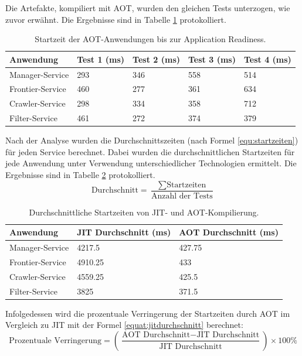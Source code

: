 Die Artefakte, kompiliert mit \ac{AOT}, wurden den gleichen Tests unterzogen, wie zuvor erwähnt. Die Ergebnisse sind in Tabelle \ref{tab:startzeitaot} protokolliert.
\begin{table}[H]
\centering
\begin{tabular}{|l|l|l|l|l|}
\hline
\textbf{Anwendung}     & \textbf{Test 1 (ms)} & \textbf{Test 2 (ms)} & \textbf{Test 3 (ms)} & \textbf{Test 4 (ms)} \\ \hline
\multirow{1}{*}{Manager-Service}  & 293 & 346 & 558 & 514 \\ \hline
\multirow{1}{*}{Frontier-Service}        & 460 & 277 & 361 & 634 \\ \hline
\multirow{1}{*}{Crawler-Service}         & 298 & 334 & 358 & 712 \\ \hline
\multirow{1}{*}{Filter-Service}          & 461 & 272 & 374 & 379 \\ \hline
\end{tabular}
\caption{Startzeit der AOT-Anwendungen bis zur Application Readiness.}
\label{tab:startzeitaot}
\end{table}
Nach der Analyse wurden die Durchschnittszeiten (nach Formel \ref{equ:startzeiten}) für jeden Service berechnet. Dabei wurden die durchschnittlichen Startzeiten für jede Anwendung unter Verwendung unterschiedlicher Technologien ermittelt. Die Ergebnisse sind in Tabelle \ref{table:druch} protokolliert.
\begin{equation}
\text{Durchschnitt} = \frac{\sum \text{Startzeiten}}{\text{Anzahl der Tests}}    
 \label{equ:startzeiten}
\end{equation}

\begin{table}[H]
\centering
\begin{tabular}{|l|l|l|}
\hline
\textbf{Anwendung}        & \textbf{JIT Durchschnitt (ms)} & \textbf{AOT Durchschnitt (ms)} \\ \hline
Manager-Service  & 4217.5                & 427.75                \\ \hline
Frontier-Service & 4910.25               & 433                   \\ \hline
Crawler-Service  & 4559.25               & 425.5                 \\ \hline
Filter-Service   & 3825                  & 371.5                 \\ \hline
\end{tabular}
\caption{Durchschnittliche Startzeiten von JIT- und AOT-Kompilierung.}
\label{table:druch}
\end{table}
Infolgedessen wird die prozentuale Verringerung der Startzeiten durch \ac{AOT} im Vergleich zu \ac{JIT} mit der Formel \ref{equat:jitdurchschnitt} berechnet:
\begin{equation}
    \text{Prozentuale Verringerung} = \left( \frac{\text{AOT Durchschnitt} - \text{JIT Durchschnitt}}{\text{JIT Durchschnitt}} \right) \times 100\%
\label{equat:jitdurchschnitt}
\end{equation}

